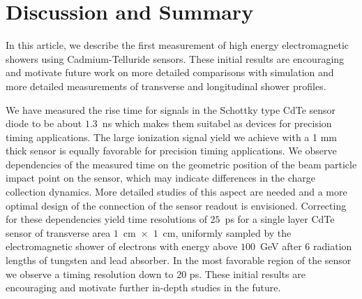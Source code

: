 
\section{Discussion and Summary}
\label{sec:summary} 


In this article, we describe the first measurement of high energy 
electromagnetic showers using Cadmium-Telluride sensors. 
These initial results are encouraging and motivate future work on 
more detailed comparisons with simulation and more detailed 
measurements of transverse and longitudinal shower profiles.



We have measured the rise time for signals in the Schottky type CdTe sensor diode to be about 
$1.3$~ns which makes them suitabel as devices for precision timing applications.
The large ionization signal yield we achieve with a 1 mm thick sensor is equally favorable for precision
timing applications.
We observe dependencies of the measured time on the geometric position of the
beam particle impact point on the sensor, which may indicate differences in the charge collection dynamics.
More detailed studies of this aspect are needed and a more optimal design of the 
connection of the sensor readout is envisioned. Correcting for these dependencies yield time resolutions
of $25$~ps for a single layer CdTe sensor of transverse area $1$~cm~$\times$~$1$~cm,
 uniformly sampled by the electromagnetic shower of electrons with energy above $100$~GeV 
after $6$ radiation lengths of tungsten and lead absorber. In the most favorable region of the sensor we 
observe a timing resolution down to 20 ps. These initial results are encouraging and motivate 
further in-depth studies in the future.



